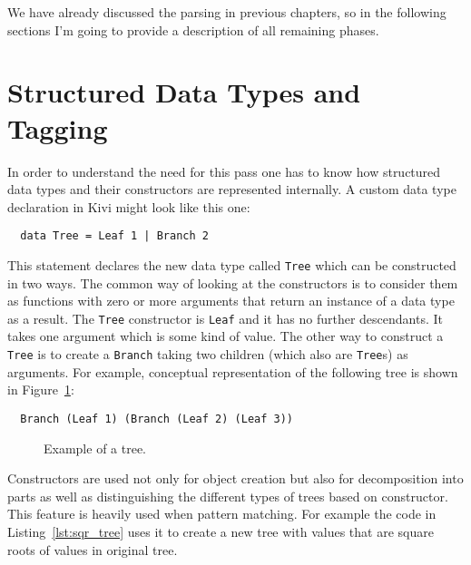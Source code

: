\documentclass[a4paper]{report}
\begin{document}
We have already discussed the parsing in previous chapters, so in the following
sections I'm going to provide a description of all remaining phases.

\section{Structured Data Types and Tagging}
In order to understand the need for this pass one has to know how structured
data types and their constructors are represented internally.
A custom data type declaration in Kivi might look like this one:

\begin{verbatim}
  data Tree = Leaf 1 | Branch 2
\end{verbatim}

This statement declares the new data type called \texttt{Tree} which can be
constructed in two ways. The common way of looking at the constructors is to
consider them as functions with zero or more arguments that return an instance
of a data type as a result. The \texttt{Tree} constructor is \texttt{Leaf} and
it has no further descendants. It takes one argument which is some kind of
value. The other way to construct a \texttt{Tree} is to create a \texttt{Branch}
taking two children (which also are \texttt{Tree}s) as arguments. For example,
conceptual representation of the following tree is shown in Figure~\ref{fig:tree}:

\begin{verbatim}
  Branch (Leaf 1) (Branch (Leaf 2) (Leaf 3))
\end{verbatim}

\begin{figure}[h!]
  \centering
  \caption{Example of a tree.}
  \label{fig:tree}
\end{figure}

Constructors are used not only for object creation but also for decomposition
into parts as well as distinguishing the different types of trees based on
constructor. This feature is heavily used when pattern matching. For example
the code in Listing~\ref{lst:sqr_tree} uses it to create a new tree with values
that are square roots of values in original tree.
\end{document}

